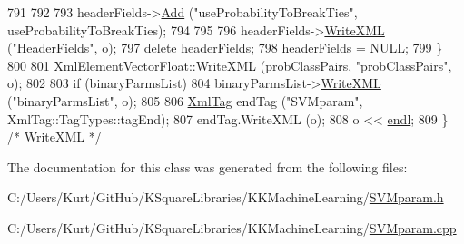 \begin{DoxyCode}
791 
792 
793     headerFields->\hyperlink{class_k_k_b_1_1_xml_element_key_value_pairs_a183f57a4bf399567339851b93fa127c9}{Add} (\textcolor{stringliteral}{"useProbabilityToBreakTies"},  useProbabilityToBreakTies);
794 
795 
796     headerFields->\hyperlink{class_k_k_b_1_1_xml_element_key_value_pairs_a4966d11afdfcd60157586c3ca56fcc5e}{WriteXML} (\textcolor{stringliteral}{"HeaderFields"}, o);
797     \textcolor{keyword}{delete}  headerFields;
798     headerFields = NULL;
799   \}
800 
801   XmlElementVectorFloat::WriteXML (probClassPairs, \textcolor{stringliteral}{"probClassPairs"}, o);
802 
803   \textcolor{keywordflow}{if}  (binaryParmsList)
804     binaryParmsList->\hyperlink{class_k_k_m_l_l_1_1_binary_class_parms_list_a8ba8095904b370032cd0272f35c83645}{WriteXML} (\textcolor{stringliteral}{"binaryParmsList"}, o);
805 
806   \hyperlink{class_k_k_b_1_1_xml_tag}{XmlTag}  endTag (\textcolor{stringliteral}{"SVMparam"}, XmlTag::TagTypes::tagEnd);
807   endTag.WriteXML (o);
808   o << \hyperlink{namespace_k_k_b_ad1f50f65af6adc8fa9e6f62d007818a8}{endl};
809 \}  \textcolor{comment}{/* WriteXML */}
\end{DoxyCode}


The documentation for this class was generated from the following files\+:\begin{DoxyCompactItemize}
\item 
C\+:/\+Users/\+Kurt/\+Git\+Hub/\+K\+Square\+Libraries/\+K\+K\+Machine\+Learning/\hyperlink{_s_v_mparam_8h}{S\+V\+Mparam.\+h}\item 
C\+:/\+Users/\+Kurt/\+Git\+Hub/\+K\+Square\+Libraries/\+K\+K\+Machine\+Learning/\hyperlink{_s_v_mparam_8cpp}{S\+V\+Mparam.\+cpp}\end{DoxyCompactItemize}
